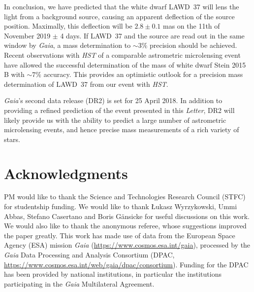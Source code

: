 \documentclass[fleqn,usenatbib]{mnras}
\begin{document}
In conclusion, we have predicted that the white dwarf LAWD~37 will lens the light from a background source, causing an apparent deflection of the source position. Maximally, this deflection will be $2.8\pm0.1$ mas on the 11th of November 2019 $\pm$ 4 days. If LAWD~37 and the source are read out in the same window by {\it Gaia}, a mass determination to $\sim 3\%$ precision should be achieved. Recent observations with {\it HST} of a comparable astrometric microlensing event have allowed the successful determination of the mass of white dwarf Stein 2015 B with $\sim7\%$ accuracy. This provides an optimistic outlook for a precision mass determination of LAWD~37 from our event with {\it HST}. 

{\it Gaia}'s second data release (DR2) is set for 25 April 2018. In addition to providing a refined prediction of the event presented in this {\it Letter}, DR2 will likely provide us with the ability to predict a large number of astrometric microlensing events, and hence precise mass measurements of a rich variety of stars.


\section*{Acknowledgments}
PM would like to thank the Science and Technologies Research Council (STFC) for studentship funding. We
would like to thank  \L ukasz Wyrzykowski, Ummi Abbas, Stefano Casertano and Boris G\"ansicke for useful discussions on this work. We would also like to thank the anonymous referee, whose suggestions improved the paper greatly. This work has made use of data from the European Space Agency (ESA) mission {\it Gaia} (\url{https://www.cosmos.esa.int/gaia}), processed by the {\it Gaia} Data Processing and Analysis Consortium (DPAC,
\url{https://www.cosmos.esa.int/web/gaia/dpac/consortium}). Funding for the DPAC has been provided by national institutions, in particular the institutions participating in the {\it Gaia} Multilateral Agreement.









\bsp	%
\label{lastpage}
\end{document}

